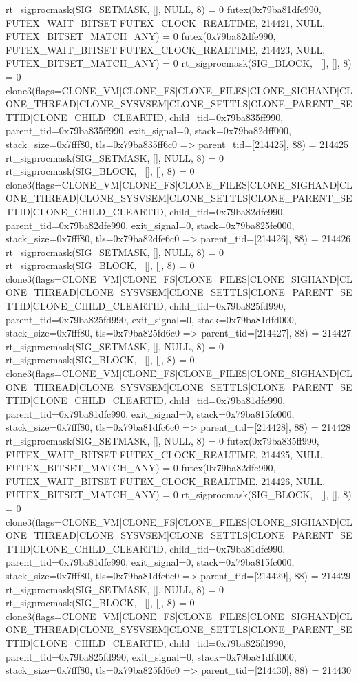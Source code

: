\begin{breakableverbatim}
rt_sigprocmask(SIG_SETMASK, [], NULL, 8) = 0
futex(0x79ba81dfc990, FUTEX_WAIT_BITSET|FUTEX_CLOCK_REALTIME, 214421, NULL, FUTEX_BITSET_MATCH_ANY) = 0
futex(0x79ba82dfe990, FUTEX_WAIT_BITSET|FUTEX_CLOCK_REALTIME, 214423, NULL, FUTEX_BITSET_MATCH_ANY) = 0
rt_sigprocmask(SIG_BLOCK, ~[], [], 8)   = 0
clone3({flags=CLONE_VM|CLONE_FS|CLONE_FILES|CLONE_SIGHAND|CLONE_THREAD|CLONE_SYSVSEM|CLONE_SETTLS|CLONE_PARENT_SETTID|CLONE_CHILD_CLEARTID, child_tid=0x79ba835ff990, parent_tid=0x79ba835ff990, exit_signal=0, stack=0x79ba82dff000, stack_size=0x7fff80, tls=0x79ba835ff6c0} => {parent_tid=[214425]}, 88) = 214425
rt_sigprocmask(SIG_SETMASK, [], NULL, 8) = 0
rt_sigprocmask(SIG_BLOCK, ~[], [], 8)   = 0
clone3({flags=CLONE_VM|CLONE_FS|CLONE_FILES|CLONE_SIGHAND|CLONE_THREAD|CLONE_SYSVSEM|CLONE_SETTLS|CLONE_PARENT_SETTID|CLONE_CHILD_CLEARTID, child_tid=0x79ba82dfe990, parent_tid=0x79ba82dfe990, exit_signal=0, stack=0x79ba825fe000, stack_size=0x7fff80, tls=0x79ba82dfe6c0} => {parent_tid=[214426]}, 88) = 214426
rt_sigprocmask(SIG_SETMASK, [], NULL, 8) = 0
rt_sigprocmask(SIG_BLOCK, ~[], [], 8)   = 0
clone3({flags=CLONE_VM|CLONE_FS|CLONE_FILES|CLONE_SIGHAND|CLONE_THREAD|CLONE_SYSVSEM|CLONE_SETTLS|CLONE_PARENT_SETTID|CLONE_CHILD_CLEARTID, child_tid=0x79ba825fd990, parent_tid=0x79ba825fd990, exit_signal=0, stack=0x79ba81dfd000, stack_size=0x7fff80, tls=0x79ba825fd6c0} => {parent_tid=[214427]}, 88) = 214427
rt_sigprocmask(SIG_SETMASK, [], NULL, 8) = 0
rt_sigprocmask(SIG_BLOCK, ~[], [], 8)   = 0
clone3({flags=CLONE_VM|CLONE_FS|CLONE_FILES|CLONE_SIGHAND|CLONE_THREAD|CLONE_SYSVSEM|CLONE_SETTLS|CLONE_PARENT_SETTID|CLONE_CHILD_CLEARTID, child_tid=0x79ba81dfc990, parent_tid=0x79ba81dfc990, exit_signal=0, stack=0x79ba815fc000, stack_size=0x7fff80, tls=0x79ba81dfc6c0} => {parent_tid=[214428]}, 88) = 214428
rt_sigprocmask(SIG_SETMASK, [], NULL, 8) = 0
futex(0x79ba835ff990, FUTEX_WAIT_BITSET|FUTEX_CLOCK_REALTIME, 214425, NULL, FUTEX_BITSET_MATCH_ANY) = 0
futex(0x79ba82dfe990, FUTEX_WAIT_BITSET|FUTEX_CLOCK_REALTIME, 214426, NULL, FUTEX_BITSET_MATCH_ANY) = 0
rt_sigprocmask(SIG_BLOCK, ~[], [], 8)   = 0
clone3({flags=CLONE_VM|CLONE_FS|CLONE_FILES|CLONE_SIGHAND|CLONE_THREAD|CLONE_SYSVSEM|CLONE_SETTLS|CLONE_PARENT_SETTID|CLONE_CHILD_CLEARTID, child_tid=0x79ba81dfc990, parent_tid=0x79ba81dfc990, exit_signal=0, stack=0x79ba815fc000, stack_size=0x7fff80, tls=0x79ba81dfc6c0} => {parent_tid=[214429]}, 88) = 214429
rt_sigprocmask(SIG_SETMASK, [], NULL, 8) = 0
rt_sigprocmask(SIG_BLOCK, ~[], [], 8)   = 0
clone3({flags=CLONE_VM|CLONE_FS|CLONE_FILES|CLONE_SIGHAND|CLONE_THREAD|CLONE_SYSVSEM|CLONE_SETTLS|CLONE_PARENT_SETTID|CLONE_CHILD_CLEARTID, child_tid=0x79ba825fd990, parent_tid=0x79ba825fd990, exit_signal=0, stack=0x79ba81dfd000, stack_size=0x7fff80, tls=0x79ba825fd6c0} => {parent_tid=[214430]}, 88) = 214430

\end{breakableverbatim}
